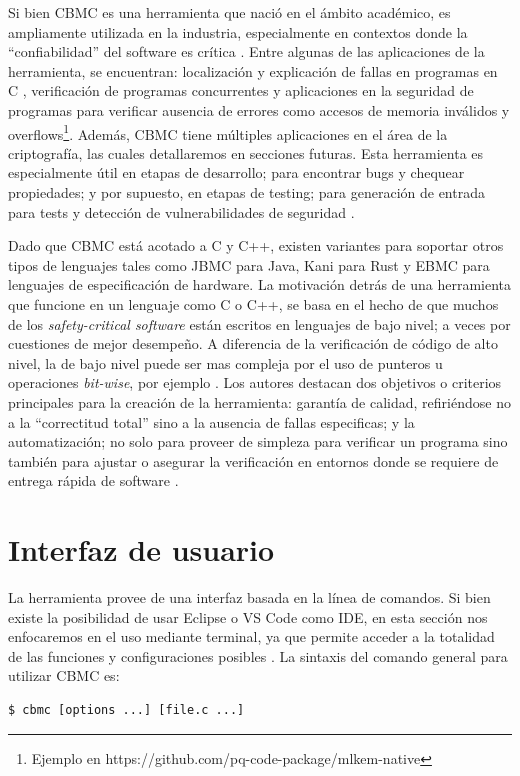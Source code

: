 \documentclass[runningheads]{llncs}
\begin{document}
Si bien CBMC es una herramienta que nació en el ámbito académico, es ampliamente utilizada en la industria, especialmente en contextos donde la “confiabilidad” del software es crítica \cite{cbmc-paper}.
Entre algunas de las aplicaciones de la herramienta, se encuentran: localización y explicación de fallas en programas en C \cite{fails-explanation}, verificación de programas concurrentes \cite{cbmc-concurrent} y aplicaciones en la seguridad de programas para verificar ausencia de errores como accesos de memoria inválidos y overflows\footnote[2]{Ejemplo en https://github.com/pq-code-package/mlkem-native}.
Además, CBMC tiene múltiples aplicaciones en el área de la criptografía, las cuales detallaremos en secciones futuras.
Esta herramienta es especialmente útil en etapas de desarrollo; para encontrar bugs y chequear propiedades; y por supuesto, en etapas de testing; para generación de entrada para tests y detección de vulnerabilidades de seguridad \cite{cbmc-paper}.

Dado que CBMC está acotado a C y C++, existen variantes para soportar otros tipos de lenguajes tales como JBMC para Java, Kani para Rust y EBMC para lenguajes de especificación de hardware.
La motivación detrás de una herramienta que funcione en un lenguaje como C o C++, se basa en el hecho de que muchos de los \textit{safety-critical software} están escritos en lenguajes de bajo nivel; a veces por cuestiones de mejor desempeño.
A diferencia de la verificación de código de alto nivel, la de bajo nivel puede ser mas compleja por el uso de punteros u operaciones \textit{bit-wise}, por ejemplo \cite{tacas-2004}.
Los autores destacan dos objetivos o criterios principales para la creación de la herramienta: garantía de calidad, refiriéndose no a la “correctitud total” sino a la ausencia de fallas especificas; y la automatización; no solo para proveer de simpleza para verificar un programa sino también para ajustar o asegurar la verificación en entornos donde se requiere de entrega rápida de software \cite{tacas-2004}.

\section{Interfaz de usuario}
La herramienta provee de una interfaz basada en la línea de comandos. Si bien existe la posibilidad de usar Eclipse o VS Code como IDE, en esta sección nos enfocaremos en el uso mediante terminal, ya que permite acceder a la totalidad de las funciones y configuraciones posibles \cite{cprover-manual}.
La sintaxis del comando general para utilizar CBMC es:
\begin{verbatim}
$ cbmc [options ...] [file.c ...]
\end{verbatim}
\end{document}
